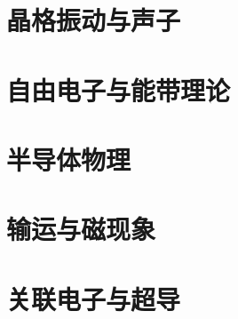\part{晶格振动与声子}\label{part:phonons}\setpartcolor{\value{part}}

\newpage

\newpage

\newpage


\part{自由电子与能带理论}\label{part:band-theory}\setpartcolor{\value{part}}

\newpage

\newpage

\newpage

\newpage


\part{半导体物理}\label{part:semiconductors}\setpartcolor{\value{part}}

\newpage

\newpage


\part{输运与磁现象}\label{part:transport}\setpartcolor{\value{part}}

\newpage


\part{关联电子与超导}\label{part:correlated}\setpartcolor{\value{part}}

\newpage

\newpage


% 


